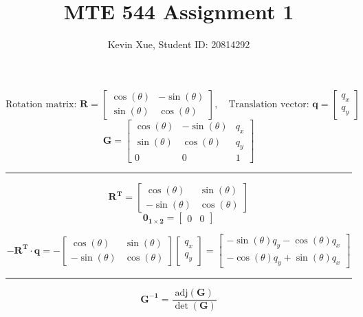 \documentclass{article}
\title{MTE 544 Assignment 1}
\author{Kevin Xue, Student ID: 20814292}
\begin{document}
\maketitle

\section{}
\[
\text{Rotation matrix: }
\bm{\mathbf{R}} = \begin{bmatrix}
\cos(\theta) & -\sin(\theta) \\
\sin(\theta) & \cos(\theta)
\end{bmatrix},
\quad
\text{Translation vector: }
\bm{\mathbf{q}} = \begin{bmatrix}
q_x \\
q_y
\end{bmatrix}
\]
\[
\bm{\mathbf{G}} = \begin{bmatrix}
\cos(\theta) & -\sin(\theta) & q_x \\
\sin(\theta) & \cos(\theta)  & q_y \\
0            & 0             & 1
\end{bmatrix}
\]
\rule{\linewidth}{0.2mm}

\begin{equation}
\bm{\mathbf{R^T}} = \begin{bmatrix}
\cos(\theta) & \sin(\theta) \\
-\sin(\theta) & \cos(\theta)
\end{bmatrix}
\end{equation}
\quad
\begin{equation}
\bm{\mathbf{0}_{1 \times 2}} = \begin{bmatrix}
0 & 0
\end{bmatrix}
\end{equation}

\begin{equation}
-\bm{\mathbf{R^T}} \cdot \bm{\mathbf{q}} = -\begin{bmatrix}
\cos(\theta) & \sin(\theta) \\ -\sin(\theta) & \cos(\theta)
\end{bmatrix} \begin{bmatrix}
q_x \\ q_y
\end{bmatrix}
= \begin{bmatrix}
- \sin(\theta)q_y - \cos(\theta)q_x  \\ -\cos(\theta)q_y + \sin(\theta)q_x 
\end{bmatrix}
\end{equation}
\rule{\linewidth}{0.2mm}
\[
\bm{\mathbf{G^{-1}}} = \frac{\text{adj}(\bm{\mathbf{G}})}{\det(\bm{\mathbf{G}})}
\]
\end{document}
